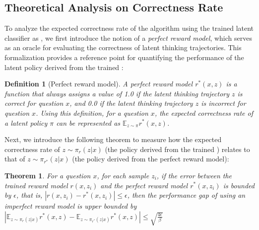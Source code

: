 \documentclass{article} %
\newtheorem{theorem}{Theorem}
\newtheorem{definition}{Definition}
\begin{document}
\subsection{Theoretical Analysis on Correctness Rate}\label{appendix:theoretical_analysis_correctness_rate}
To analyze the expected correctness rate of the \LTO algorithm using the trained latent classifier as \LRM, we first introduce the notion of a \emph{perfect reward model}, which serves as an oracle for evaluating the correctness of latent thinking trajectories. This formalization provides a reference point for quantifying the performance of the latent policy derived from the trained \LRM: 
\begin{definition}[Perfect reward model]
A perfect reward model $r^{*}(x, z)$ is a function that always assigns a value of 1.0 if the latent thinking trajectory $z$ is correct for question $x$, and 0.0 if the latent thinking trajectory $z$ is incorrect for question $x$. Using this definition, for a question $x$, the expected correctness rate of a latent policy $\pi$ can be represented as $\mathbb{E}_{z\sim\pi} r^{*}(x,z)$.
\end{definition}
Next, we introduce the following theorem to measure how the expected correctness rate of $z\sim\pi_{r}(z|x)$ (the policy derived from the trained \LRM) relates to that of $z\sim\pi_{r^{*}}(z|x)$ (the policy derived from the perfect reward model):
\begin{theorem}\label{thm:reward_bound_appendix}
    For a question $x$, for each sample $z_i$, if the error between the trained reward model $r(x,z_i)$ and the perfect reward model $r^{*}(x,z_i)$ is bounded by $\epsilon$, that is, $\left|r(x,z_i)-r^{*}(x,z_i)\right|\leq\epsilon$, then the performance gap of using an imperfect reward model is upper bounded by $\left|\mathbb{E}_{z\sim\pi_{r}(z|x)}r^{*}(x,z)-\mathbb{E}_{z\sim\pi_{r^{*}}(z|x)}r^{*}(x,z)\right|\leq\sqrt{\frac{4\epsilon}{\beta}}$
\end{theorem}
\end{document}
